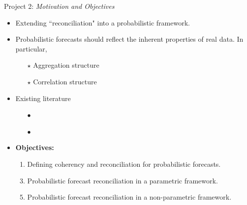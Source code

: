 \documentclass[11pt,xcolor=dvipsnames,table]{beamer} %
\begin{document}
\begin{frame}[noframenumbering]{Project 2: \textit{Motivation and Objectives}}
\begin{itemize}[<+-| alert@+>]
			\item Extending ``reconciliation" into a probabilistic framework.
			\item[]
			\item Probabilistic forecasts should reflect the inherent properties of real data. In particular, 
			\begin{itemize}[<+-| alert@+>]
				\item[$\star$] Aggregation structure
				\item[$\star$] Correlation structure
			\end{itemize}
			\item Existing literature
				\begin{itemize}[<+-| alert@+>]
					\item[$\bullet$] \citep{BenTaieb2017}
					\item[$\bullet$] \citep{Jeon2018}
			\end{itemize}
			\item[]
				
	\item \textbf{\color{Maroon}Objectives:} 
	\begin{enumerate}
		\item Defining coherency and reconciliation for probabilistic forecasts.
		\item[]
		\item Probabilistic forecast reconciliation in a parametric framework.
		\item[]
		\item Probabilistic forecast reconciliation in a non-parametric framework.
	\end{enumerate}	
	\item[]
	
\end{itemize}    
\end{frame}


%	
\end{document}
